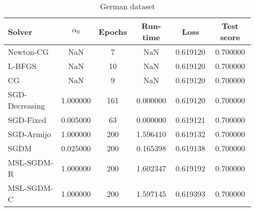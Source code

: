 \begin{table}
\caption{German dataset}
\label{tab:german-tab}
\centering
\begin{tabular}{lS[round-precision=3]S[drop-zero-decimal]S[round-precision=4]S[round-precision=6]S[round-precision=4]}
\toprule
Solver & {$\alpha_0$} & {Epochs} & {Run-time} & {Loss} & {Test score} \\
\midrule
Newton-CG & NaN & 7 & NaN & 0.619120 & 0.700000 \\
L-BFGS & NaN & 10 & NaN & 0.619120 & 0.700000 \\
CG & NaN & 9 & NaN & 0.619120 & 0.700000 \\
SGD-Decreasing & 1.000000 & 161 & 0.000000 & 0.619120 & 0.700000 \\
SGD-Fixed & 0.005000 & 63 & 0.000000 & 0.619121 & 0.700000 \\
SGD-Armijo & 1.000000 & 200 & 1.596410 & 0.619132 & 0.700000 \\
SGDM & 0.025000 & 200 & 0.165398 & 0.619138 & 0.700000 \\
MSL-SGDM-R & 1.000000 & 200 & 1.602347 & 0.619192 & 0.700000 \\
MSL-SGDM-C & 1.000000 & 200 & 1.597145 & 0.619393 & 0.700000 \\
\bottomrule
\end{tabular}
\end{table}






